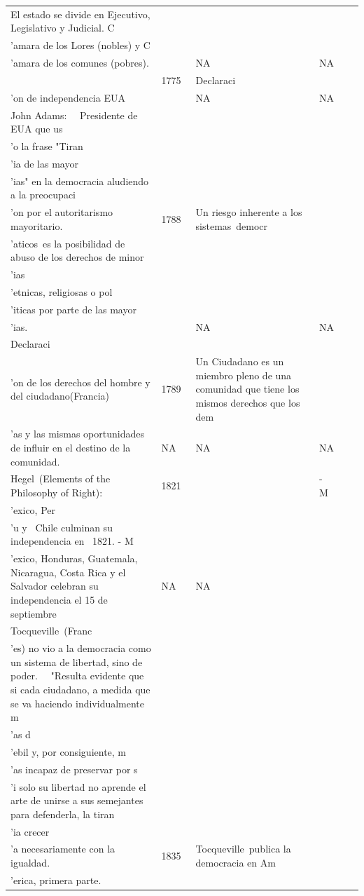 \documentclass[
  letterpaper,
  DIV=11,
  numbers=noendperiod]{scrreprt}
\begin{document}
\begin{table}
\begin{tabular*}{\linewidth}{@{\extracolsep{\fill}}lllllc}
El estado se divide en Ejecutivo, Legislativo y Judicial. C\\'amara de los Lores (nobles) y C\\'amara de los comunes (pobres). &   & NA & NA \\ 
  & 1775  & Declaraci\\'on de independencia EUA  &   & NA & NA \\ 
John Adams:  
Presidente de EUA que us\\'o la frase "Tiran\\'ia de las mayor\\'ias" en la democracia aludiendo a la preocupaci\\'on por el autoritarismo mayoritario. & 1788  & Un riesgo inherente a los sistemas democr\\'aticos es la posibilidad de abuso de los derechos de minor\\'ias \\'etnicas, religiosas o pol\\'iticas por parte de las mayor\\'ias.  &   & NA & NA \\ 
Declaraci\\'on de los derechos del hombre y del ciudadano(Francia)  & 1789  & Un Ciudadano es un miembro pleno de una comunidad que tiene los mismos derechos que los dem\\'as y las mismas oportunidades de influir en el destino de la comunidad.  & NA & NA & NA \\ 
Hegel (Elements of the Philosophy of Right):  & 1821  &   & - M\\'exico, Per\\'u y  Chile culminan su independencia en  1821.
- M\\'exico, Honduras, Guatemala, Nicaragua, Costa Rica y el Salvador celebran su independencia el 15 de septiembre & NA & NA \\ 
Tocqueville (Franc\\'es) no vio a la democracia como un sistema de libertad, sino de poder.  
"Resulta evidente que si cada ciudadano, a medida que se va haciendo individualmente m\\'as d\\'ebil y, por consiguiente, m\\'as incapaz de preservar por s\\'i solo su libertad no aprende el arte de unirse a sus semejantes para defenderla, la tiran\\'ia crecer\\'a necesariamente con la igualdad. & 1835  & Tocqueville publica la democracia en Am\\'erica, primera parte.  


\end{tabular*}
\end{table}
\end{document}
